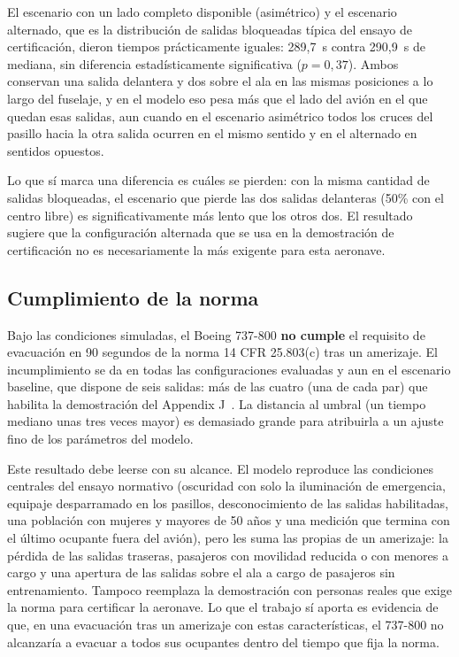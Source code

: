 \documentclass[a4paper, 11pt]{article}
\newif\ifmostraravisos
\newcommand{\pendiente}{%
  \ifmostraravisos
    \par\medskip\noindent
    \colorbox{yellow}{\parbox{\dimexpr\linewidth-2\fboxsep\relax}{\small\textbf{[ESTOS DATOS SON ANTES DE TERMINAR EL PROYECTO, UNA VEZ TERMINADO VOLVER A ESCRIBIR ESTA CONCLUSIÓN/FOTO]}}}%
    \par\medskip
  \fi}
\begin{document}
\pendiente

El escenario con un lado completo disponible (asim\'etrico) y el escenario
alternado, que es la distribuci\'on de salidas bloqueadas t\'ipica del ensayo de
certificaci\'on, dieron tiempos pr\'acticamente iguales: 289,7~s contra 290,9~s de
mediana, sin diferencia estad\'isticamente significativa ($p = 0{,}37$). Ambos
conservan una salida delantera y dos sobre el ala en las mismas posiciones a lo
largo del fuselaje, y en el modelo eso pesa m\'as que el lado del avi\'on en el que
quedan esas salidas, aun cuando en el escenario asim\'etrico todos los cruces del
pasillo hacia la otra salida ocurren en el mismo sentido y en el alternado en
sentidos opuestos.

Lo que s\'i marca una diferencia es cu\'ales se pierden: con la misma cantidad de
salidas bloqueadas, el escenario que pierde las dos salidas delanteras (50\% con el
centro libre) es significativamente m\'as lento que los otros dos. El resultado
sugiere que la configuraci\'on alternada que se usa en la demostraci\'on de
certificaci\'on no es necesariamente la m\'as exigente para esta aeronave.

\subsection{Cumplimiento de la norma}

\pendiente

Bajo las condiciones simuladas, el Boeing 737-800 \textbf{no cumple} el requisito de
evacuaci\'on en 90 segundos de la norma 14 CFR 25.803(c) tras un amerizaje. El
incumplimiento se da en todas las configuraciones evaluadas y aun en el escenario
baseline, que dispone de seis salidas: m\'as de las cuatro (una de cada par) que
habilita la demostraci\'on del Appendix J~\cite{cfrAppJ}. La distancia al umbral
(un tiempo mediano unas tres veces mayor) es demasiado grande para atribuirla a un
ajuste fino de los par\'ametros del modelo.

Este resultado debe leerse con su alcance. El modelo reproduce las condiciones
centrales del ensayo normativo (oscuridad con solo la iluminaci\'on de emergencia,
equipaje desparramado en los pasillos, desconocimiento de las salidas habilitadas,
una poblaci\'on con mujeres y mayores de 50 a\~nos y una medici\'on que termina con el
\'ultimo ocupante fuera del avi\'on), pero les suma las propias de un amerizaje: la
p\'erdida de las salidas traseras, pasajeros con movilidad reducida o con menores a
cargo y una apertura de las salidas sobre el ala a cargo de pasajeros sin
entrenamiento. Tampoco reemplaza la demostraci\'on con personas reales que exige la
norma para certificar la aeronave. Lo que el trabajo s\'i aporta es evidencia de que,
en una evacuaci\'on tras un amerizaje con estas caracter\'isticas, el 737-800 no
alcanzar\'ia a evacuar a todos sus ocupantes dentro del tiempo que fija la norma.
\end{document}
